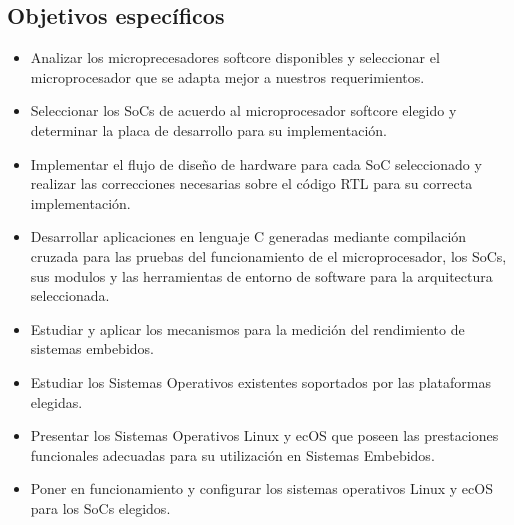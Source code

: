 \subsection{Objetivos específicos}
  \begin{itemize}
 \item Analizar los microprecesadores softcore disponibles y seleccionar el microprocesador que se adapta mejor a nuestros requerimientos.

  
\item Seleccionar los SoCs de acuerdo al microprocesador softcore elegido y determinar la placa de desarrollo para su implementación.

\item Implementar el flujo de diseño de hardware para cada SoC seleccionado y realizar las correcciones necesarias sobre el código RTL para su correcta implementación. 
\item Desarrollar  aplicaciones en lenguaje C generadas mediante compilación cruzada para las pruebas del funcionamiento de el microprocesador, los SoCs, sus modulos y las herramientas de entorno de software para la arquitectura seleccionada.
\item Estudiar y aplicar los mecanismos para la medición del rendimiento de sistemas embebidos. 
\item Estudiar los Sistemas Operativos existentes soportados por las plataformas elegidas.
\item Presentar los Sistemas Operativos Linux y ecOS que poseen las prestaciones funcionales adecuadas para su utilización en Sistemas Embebidos.
\item Poner en funcionamiento y configurar los sistemas operativos Linux y ecOS para los SoCs elegidos.
 \end{itemize}




